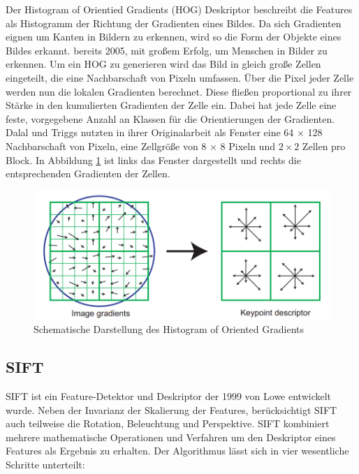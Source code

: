 Der Histogram of Orientied Gradients (HOG) Deskriptor beschreibt die Features als Histogramm der Richtung der Gradienten eines Bildes. Da sich Gradienten eignen um Kanten in Bildern zu erkennen, wird so die Form der Objekte eines Bildes erkannt.  bereits 2005, mit großem Erfolg, um Menschen in Bilder zu erkennen. 
Um ein HOG zu generieren wird das Bild in gleich große Zellen eingeteilt, die eine Nachbarschaft von Pixeln umfassen. Über die Pixel jeder Zelle werden nun die lokalen Gradienten berechnet. Diese fließen proportional zu ihrer Stärke in den kumulierten Gradienten der Zelle ein. Dabei hat jede Zelle eine feste, vorgegebene Anzahl an Klassen für die Orientierungen der Gradienten. 
Dalal und Triggs nutzten in ihrer Originalarbeit als Fenster eine 64 $\times$ 128 Nachbarschaft von Pixeln, eine Zellgröße von 8 $\times$ 8 Pixeln und $2 \times 2$ Zellen pro Block. In Abbildung \ref{img:hog} ist links das Fenster dargestellt und rechts die entsprechenden Gradienten der Zellen. 

\begin{figure}
	\centering
	\includegraphics[scale=0.5]{images/hog.png}
	\caption{Schematische Darstellung des Histogram of Oriented Gradients  \cite{dif2004}}
	\label{img:hog}
\end{figure}

\subsection{SIFT}

SIFT ist ein Feature-Detektor und Deskriptor der 1999 von Lowe \cite{dif2004} entwickelt wurde. Neben der Invarianz der Skalierung der Features, berücksichtigt SIFT auch teilweise die Rotation, Beleuchtung und Perspektive. SIFT kombiniert mehrere mathematische Operationen und Verfahren um den Deskriptor eines Features als Ergebnis zu erhalten. Der Algorithmus lässt sich in vier wesentliche Schritte unterteilt:

